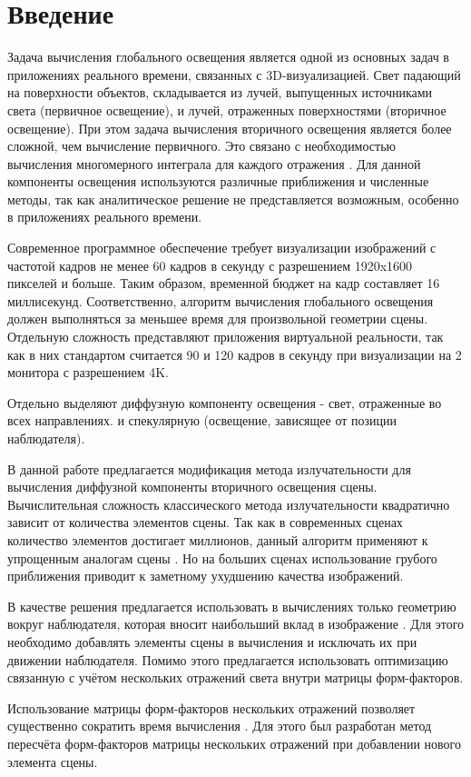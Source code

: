\documentclass[oneside,final,12pt, a4paper]{extreport}
\newcommand{\sect}[1]{%
  \newpage%
  \section*{#1}%
  \addcontentsline{toc}{section}{#1}}
\begin{document}
\sect{Введение}

Задача вычисления глобального освещения является одной из основных задач в приложениях реального времени, связанных с 3D-визуализацией. Свет падающий на поверхности объектов, складывается из лучей, выпущенных источниками света (первичное освещение), и лучей, отраженных поверхностями (вторичное освещение). При этом задача вычисления вторичного освещения является более сложной, чем вычисление первичного. Это связано с необходимостью вычисления многомерного интеграла для каждого отражения \cite{RT_rendering}. Для данной компоненты освещения используются различные приближения и численные методы, так как аналитическое решение не представляется возможным, особенно в приложениях реального времени.

Современное программное обеспечение требует визуализации изображений с частотой кадров не менее 60 кадров в секунду с разрешением 1920x1600 пикселей и больше. Таким образом, временной бюджет на кадр составляет 16 миллисекунд. Соответственно, алгоритм вычисления глобального освещения должен выполняться за меньшее время для произвольной геометрии сцены. Отдельную сложность представляют приложения виртуальной реальности, так как в них стандартом считается 90 и 120 кадров в секунду при визуализации на 2 монитора с разрешением 4K.

Отдельно выделяют диффузную компоненту освещения - свет, отраженные во всех направлениях. и спекулярную (освещение, зависящее от позиции наблюдателя).

В данной работе предлагается модификация метода излучательности для вычисления диффузной компоненты вторичного освещения сцены. Вычислительная сложность классического метода излучательности квадратично зависит от количества элементов сцены. Так как в современных сценах количество элементов достигает миллионов, данный алгоритм применяют к упрощенным аналогам сцены \cite{Radiosity_simplification}. Но на больших сценах использование грубого приближения приводит к заметному ухудшению качества изображений.

В качестве решения предлагается использовать в вычислениях только геометрию вокруг наблюдателя, которая вносит наибольший вклад в изображение \cite{Anton}. Для этого необходимо добавлять элементы сцены в вычисления и исключать их при движении наблюдателя. Помимо этого предлагается использовать оптимизацию связанную с учётом нескольких отражений света внутри матрицы форм-факторов.

Использование матрицы форм-факторов нескольких отражений позволяет существенно сократить время вычисления \cite{Radiosity_multibounce}. Для этого был разработан метод пересчёта форм-факторов матрицы нескольких отражений при добавлении нового элемента сцены.
\end{document}
